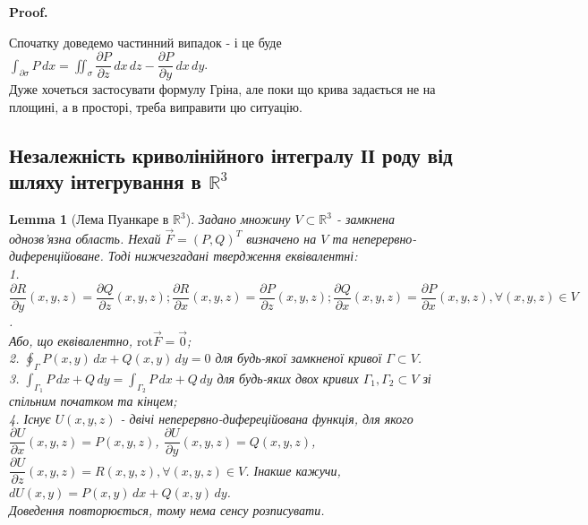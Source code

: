 \documentclass[a4paper, 10pt]{article}
\makeatletter
\def\departial#1#2{\dfrac{\partial {#1}}{\partial {#2}}}
\def\qed{$\blacksquare$}
\theoremstyle{theoremdd}
\theoremstyle{theoremdd}
\theoremstyle{theoremdd}
\theoremstyle{theoremdd}
\theoremstyle{theoremdd}
\theoremstyle{theoremdd}
\theoremstyle{theoremdd}
\newtheorem{lemma}[theorem]{Lemma}
\theoremstyle{theoremdd}
\renewenvironment{proof}[1][Proof.\\]{\par
\pushQED{\hfill \qed}%
\normalfont \topsep6\p@\@plus6\p@\relax
\trivlist
\item\relax
{\bfseries
#1\@addpunct{.}}\hspace\labelsep\ignorespaces
}{%
\popQED\endtrivlist\@endpefalse
}
\makeatother
\begin{document}
\begin{proof}
Спочатку доведемо частинний випадок - і це буде $\displaystyle\int_{\partial \sigma} P\,dx = \iint_\sigma \departial{P}{z}\,dx\,dz - \departial{P}{y}\,dx\,dy$.\\
Дуже хочеться застосувати формулу Гріна, але поки що крива задається не на площині, а в просторі, треба виправити цю ситуацію.
\end{proof}

\subsection{Незалежність криволінійного інтегралу ІІ роду від шляху інтегрування в $\mathbb{R}^3$}
\begin{lemma}[Лема Пуанкаре в $\mathbb{R}^3$]
Задано множину $V \subset \mathbb{R}^3$ - замкнена однозв'язна область. Нехай $\vec{F} = (P,Q)^T$ визначено на $V$ та неперервно-диференційоване. Тоді нижчезгадані твердження еквівалентні:\\
1. $\departial{R}{y}(x,y,z) = \departial{Q}{z}(x,y,z); \departial{R}{x}(x,y,z) = \departial{P}{z}(x,y,z); \departial{Q}{x}(x,y,z) = \departial{P}{x}(x,y,z), \forall (x,y,z) \in V$.\\
Або, що еквівалентно, $\text{rot} \vec{F} = \vec{0}$;\\
2. $\displaystyle\oint_{\Gamma} P(x,y)\,dx + Q(x,y)\,dy = 0$ для будь-якої замкненої кривої $\Gamma \subset V$.\\
3. $\displaystyle\int_{\Gamma_1} P\,dx + Q\,dy = \int_{\Gamma_2} P\,dx + Q\,dy$ для будь-яких двох кривих $\Gamma_1, \Gamma_2 \subset V$ зі спільним початком та кінцем;\\
4. Існує $U(x,y,z)$ - двічі неперервно-дифереційована функція, для якого $\departial{U}{x}(x,y,z) = P(x,y,z)$, $\departial{U}{y}(x,y,z) = Q(x,y,z)$, $\departial{U}{z}(x,y,z) = R(x,y,z), \forall (x,y,z) \in V$. Інакше кажучи,\\ $dU(x,y) =  P(x,y)\,dx + Q(x,y)\,dy$.\\
\textit{Доведення повторюється, тому нема сенсу розписувати.}
\end{lemma}
\end{document}
